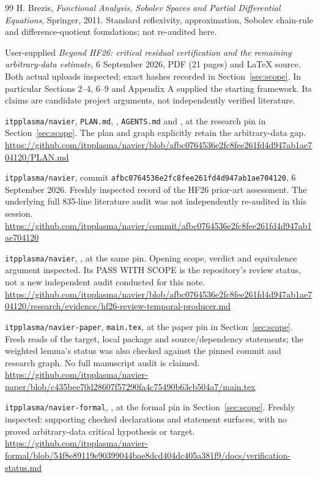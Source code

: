 \documentclass[11pt,a4paper]{article}
\theoremstyle{definition}\newtheorem{definition}[theorem]{Definition}
\theoremstyle{remark}\newtheorem{remark}[theorem]{Remark}
\numberwithin{equation}{section}
\begin{document}
\begin{thebibliography}{99}
 H. Brezis, \emph{Functional Analysis, Sobolev Spaces and Partial Differential Equations}, Springer, 2011. Standard reflexivity, approximation, Sobolev chain-rule and difference-quotient foundations; not re-audited here.

 User-supplied \emph{Beyond HF26: critical residual certification and the remaining arbitrary-data estimate}, 6 September 2026, PDF (21 pages) and LaTeX source. Both actual uploads inspected; exact hashes recorded in Section~\ref{sec:scope}. In particular Sections 2--4, 6--9 and Appendix A supplied the starting framework. Its claims are candidate project arguments, not independently verified literature.

 \texttt{itpplasma/navier}, \texttt{PLAN.md}, , \texttt{AGENTS.md} and , at the research pin in Section~\ref{sec:scope}. The plan and graph explicitly retain the arbitrary-data gap.\newline
\url{https://github.com/itpplasma/navier/blob/afbc0764536e2fc8fee261fd4d947ab1ae704120/PLAN.md}

 \texttt{itpplasma/navier}, commit \texttt{afbc0764536e2fc8fee261fd4d947ab1ae704120}, 6 September 2026. Freshly inspected record of the HF26 prior-art assessment. The underlying full 835-line literature audit was not independently re-audited in this session.\newline
\url{https://github.com/itpplasma/navier/commit/afbc0764536e2fc8fee261fd4d947ab1ae704120}

 \texttt{itpplasma/navier}, , at the same pin. Opening scope, verdict and equivalence argument inspected. Its PASS WITH SCOPE is the repository's review status, not a new independent audit conducted for this note.\newline
\url{https://github.com/itpplasma/navier/blob/afbc0764536e2fc8fee261fd4d947ab1ae704120/research/evidence/hf26-review-temporal-producer.md}

 \texttt{itpplasma/navier-paper}, \texttt{main.tex}, at the paper pin in Section~\ref{sec:scope}. Fresh reads of the target, local package and source/dependency statements; the weighted lemma's status was also checked against the pinned commit and research graph. No full manuscript audit is claimed.\newline
\url{https://github.com/itpplasma/navier-paper/blob/c435bee70d28607f57290fa4c75490b63cb504a7/main.tex}

 \texttt{itpplasma/navier-formal}, , at the formal pin in Section~\ref{sec:scope}. Freshly inspected: supporting checked declarations and statement surfaces, with no proved arbitrary-data critical hypothesis or target.\newline
\url{https://github.com/itpplasma/navier-formal/blob/54f8e89119e90399044bae8dcd404dc405a381f9/docs/verification-status.md}
\end{thebibliography}
\end{document}
